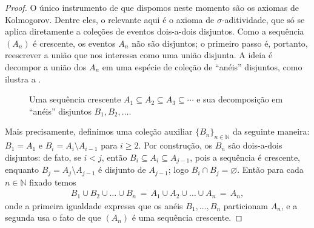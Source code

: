 \documentclass[12pt,portuguese]{article}
\let\geq\geqslant
\theoremstyle{definition}
\let\emptyset\varnothing
\begin{document}
\begin{proof}
O único instrumento de que dispomos neste momento são os axiomas de Kolmogorov.
Dentre eles, o relevante aqui é o axioma de $\sigma$-aditividade, que só se
aplica diretamente a coleções de eventos dois-a-dois disjuntos. Como a
sequência $(A_n)$ é crescente, os eventos $A_n$ não são disjuntos; o primeiro
passo é, portanto, reescrever a união que nos interessa como uma união
disjunta. A ideia é decompor a união dos $A_n$ em uma espécie de coleção de
``anéis'' disjuntos, como ilustra a .
\begin{figure}[H]
\centering
{}
\caption{Uma sequência crescente \(A_1 \subseteq A_2 \subseteq A_3 \subseteq
\cdots\) e sua decomposição em ``anéis'' disjuntos $B_1, B_2,\ldots$. 
}\label{fig:telescopia}
\end{figure}

Mais precisamente, definimos uma coleção auxiliar $\{B_n\}_{n\in\mathbb{N}}$ da seguinte maneira:
\(B_1 = A_1\) e \(B_i = A_i \setminus A_{i-1}\) para \(i \geq 2\). Por
construção, os \(B_n\) são dois-a-dois disjuntos: de fato, se \(i < j\), então
\(B_i \subseteq A_i \subseteq A_{j-1}\), pois a sequência é crescente, enquanto
\(B_j = A_j \setminus A_{j-1}\) é disjunto de \(A_{j-1}\); logo
\(B_i \cap B_j = \emptyset\).
Então para cada $n\in\mathbb{N}$ fixado temos 
\begin{align}\label{eq-aux1-cont-prob}
B_1 \cup B_2 \cup \ldots\cup B_n \,=\,  A_1\cup A_2\cup\ldots\cup A_n \, =\, A_n, 
\end{align}
onde a primeira igualdade expressa que os anéis \(B_1, \dots, B_n\) particionam
\(A_n\), e a segunda usa o fato de que \((A_n)\) é uma sequência crescente.


\end{proof}
\end{document}
